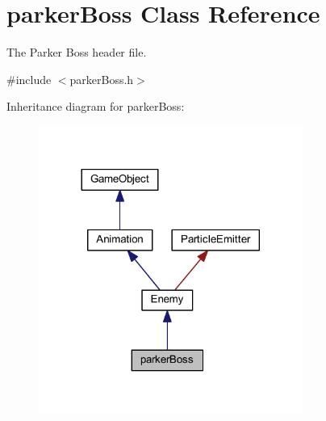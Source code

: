 \hypertarget{classparker_boss}{\section{parker\+Boss Class Reference}
\label{classparker_boss}
}


The Parker Boss header file.  




{\ttfamily \#include $<$parker\+Boss.\+h$>$}



Inheritance diagram for parker\+Boss\+:\nopagebreak
\begin{figure}[H]
\begin{center}
\leavevmode
\includegraphics[width=245pt]{classparker_boss__inherit__graph}
\end{center}
\end{figure}


